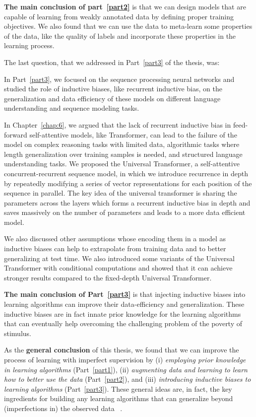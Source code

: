 \textbf{The main conclusion of part~\ref{part2}} is that we can design models that are capable of learning from weakly annotated data by defining proper training objectives. We also found that we can use the data to meta-learn some properties of the data, like the quality of labels and incorporate these properties in the learning process.

\bigskip
The last question, that we addressed in Part~\ref{part3} of the thesis, was:
%

In Part~\ref{part3}, we focused on the sequence processing neural networks and studied the role of inductive biases, like recurrent inductive bias, on the generalization and data efficiency of these models on different language understanding and sequence modeling tasks.

In Chapter~\ref{chap:6}, we argued that the lack of recurrent inductive bias in feed-forward self-attentive models, like Transformer, can lead to the failure of the model on complex reasoning tasks with limited data, algorithmic tasks where length generalization over training samples is needed, and structured language understanding tasks. We proposed the Universal Transformer, a self-attentive concurrent-recurrent sequence model, in which we introduce recurrence in depth by repeatedly modifying a series of vector representations for each position of the sequence in parallel. The key idea of the universal transformer is sharing the parameters across the layers which forms a recurrent inductive bias in depth and saves massively on the number of parameters and leads to a more data efficient model. 

We also discussed other assumptions whose encoding them in a model as inductive biases can help to extrapolate from training data and to better generalizing at test time.  We also introduced some variants of the Universal Transformer with conditional computations and showed that it can achieve stronger results compared to the fixed-depth Universal Transformer.

\textbf{The main conclusion of Part~\ref{part3}} is that injecting inductive biases into learning algorithms can improve their data-efficiency and generalization. These inductive biases are in fact innate prior knowledge for the learning algorithms that can eventually help overcoming the challenging problem of the poverty of stimulus.

\bigskip
As the \textbf{general conclusion} of this thesis, we found that we can improve the process of learning with imperfect supervision by (i) \emph{employing  prior knowledge in learning algorithms} (Part~\ref{part1}), (ii) \emph{augmenting data and learning to learn how to better use the data} (Part~\ref{part2}), and (iii) \emph{introducing inductive biases to learning algorithms} (Part~\ref{part3}). 
%
These general ideas are, in fact, the key ingredients for building any learning algorithms that can generalize beyond (imperfections in) the observed data ~\citep{Mitchell80theneed}.

